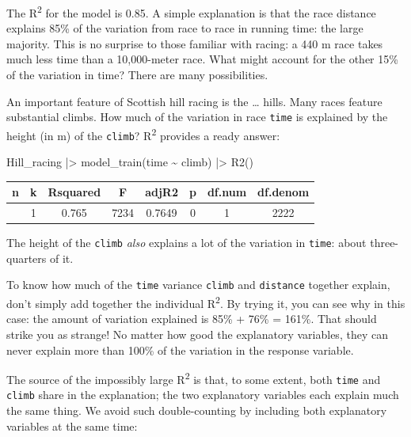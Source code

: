 \documentclass[
  letterpaper,
  DIV=11,
  numbers=noendperiod,
  oneside]{scrartcl}
\newenvironment{Shaded}{\begin{snugshade}}{\end{snugshade}}
\newcommand{\FunctionTok}[1]{\textcolor[rgb]{0.28,0.35,0.67}{#1}}
\newcommand{\NormalTok}[1]{\textcolor[rgb]{0.00,0.23,0.31}{#1}}
\newcommand{\SpecialCharTok}[1]{\textcolor[rgb]{0.37,0.37,0.37}{#1}}
\begin{document}
The R\textsuperscript{2} for the model is 0.85. A simple explanation is
that the race distance explains 85\% of the variation from race to race
in running time: the large majority. This is no surprise to those
familiar with racing: a 440 m race takes much less time than a
10,000-meter race. What might account for the other 15\% of the
variation in time? There are many possibilities.

An important feature of Scottish hill racing is the \ldots{} hills. Many
races feature substantial climbs. How much of the variation in race
\texttt{time} is explained by the height (in m) of the \texttt{climb}?
R\textsuperscript{2} provides a ready answer:

\begin{Shaded}
\begin{Highlighting}[]
\NormalTok{Hill\_racing }\SpecialCharTok{|\textgreater{}} \FunctionTok{model\_train}\NormalTok{(time }\SpecialCharTok{\textasciitilde{}}\NormalTok{ climb) }\SpecialCharTok{|\textgreater{}} \FunctionTok{R2}\NormalTok{()}
\end{Highlighting}
\end{Shaded}

\begin{longtable}[]{@{}cccccccc@{}}
\toprule\noalign{}
n & k & Rsquared & F & adjR2 & p & df.num & df.denom \\
\midrule\noalign{}
\endhead
\bottomrule\noalign{}
\endlastfoot
2224 & 1 & 0.765 & 7234 & 0.7649 & 0 & 1 & 2222 \\
\end{longtable}

The height of the \texttt{climb} \emph{also} explains a lot of the
variation in \texttt{time}: about three-quarters of it.

To know how much of the \texttt{time} variance \texttt{climb} and
\texttt{distance} together explain, don't simply add together the
individual R\textsuperscript{2}. By trying it, you can see why in this
case: the amount of variation explained is 85\% + 76\% = 161\%. That
should strike you as strange! No matter how good the explanatory
variables, they can never explain more than 100\% of the variation in
the response variable.

The source of the impossibly large R\textsuperscript{2} is that, to some
extent, both \texttt{time} and \texttt{climb} share in the explanation;
the two explanatory variables each explain much the same thing. We avoid
such double-counting by including both explanatory variables at the same
time:
\end{document}
